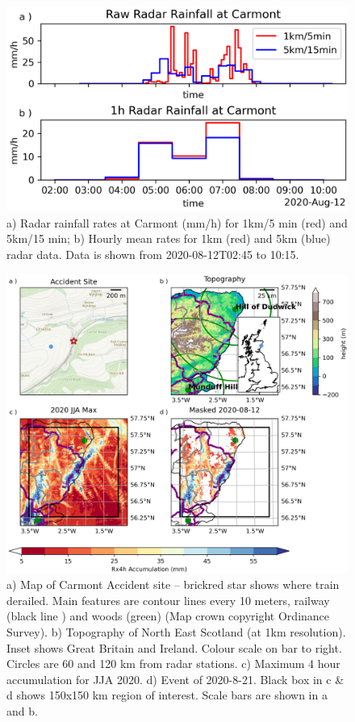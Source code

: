 \documentclass[11pt,a4paper]{article}
\begin{document}


\pagebreak
\begin{figure}[tp]
	\centering
	\includegraphics[width=0.5\linewidth]{radar_carmont.png}
	\caption{a) Radar rainfall rates at Carmont (mm/h) for 1km/5 min (red) and 5km/15 min; b) Hourly mean rates for 1km (red) and 5km (blue) radar data. Data is shown from 2020-08-12T02:45 to 10:15. }
	\label{fig:aug2020_rain}
\end{figure}

\begin{figure}[tp]
	
	\centering
	\includegraphics[width=\linewidth]{carmont_geog_group.png}
	\caption{a) Map of Carmont Accident site -- brickred star shows where train derailed. Main features are contour lines every 10 meters, railway (black line ) and woods (green) (Map crown copyright Ordinance Survey). b) Topography of North East Scotland (at 1km resolution). Inset shows Great Britain and Ireland. Colour scale on bar to right. Circles are  60 and 120 km from radar stations.  c) Maximum 4 hour accumulation  for JJA 2020. d) Event of 2020-8-21.  Black box in c \& d shows 150x150 km region of interest. Scale bars are shown in a and b.   }
	\label{fig:carmont_geog_group}
\end{figure}
\end{document}
